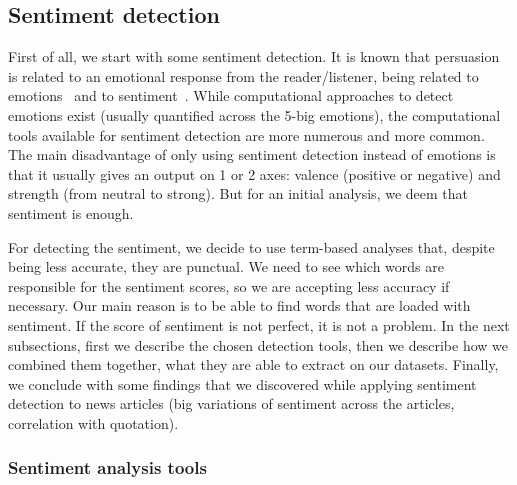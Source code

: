 \subsection{\statusorange Sentiment detection}
\label{ssec:lp_techniques_sentiment}

First of all, we start with some sentiment detection. It is known that persuasion is related to an emotional response from the reader/listener, being related to emotions~\citep{rocklage2018persuasion,petty2015emotion,desteno2004discrete} and to sentiment~\citep{gatti2014sentiment}.
While computational approaches to detect emotions exist (usually quantified across the 5-big emotions), the computational tools available for sentiment detection are more numerous and more common. The main disadvantage of only using sentiment detection instead of emotions is that it usually gives an output on 1 or 2 axes: valence (positive or negative) and strength (from neutral to strong). But for an initial analysis, we deem that sentiment is enough.

For detecting the sentiment, we decide to use term-based analyses that, despite being less accurate, they are punctual. We need to see which words are responsible for the sentiment scores, so we are accepting less accuracy if necessary. Our main reason is to be able to find words that are loaded with sentiment. If the score of sentiment is not perfect, it is not a problem. 
In the next subsections, first we describe the chosen detection tools, then we describe how we combined them together, what they are able to extract on our datasets. Finally, we conclude with some findings that we discovered while applying sentiment detection to news articles (big variations of sentiment across the articles, correlation with quotation).

\subsubsection{\statusgreen Sentiment analysis tools}

